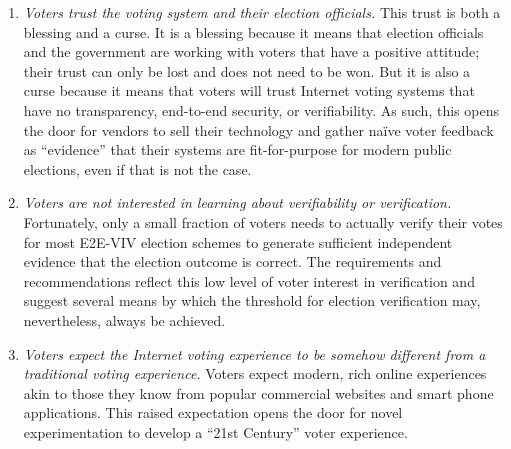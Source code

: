 \begin{enumerate}
\item \emph{Voters trust the voting system and their election
    officials.} This trust is both a blessing and a curse. It is a
  blessing because it means that election officials and the government
  are working with voters that have a positive attitude; their trust
  can only be lost and does not need to be won. But it is also a curse
  because it means that voters will trust Internet voting systems that
  have no transparency, end-to-end security, or verifiability. As
  such, this opens the door for vendors to sell their technology and
  gather na\"{i}ve voter feedback as ``evidence'' that their systems are
  fit-for-purpose for modern public elections, even if that is not the
  case.

\item \emph{Voters are not interested in learning about verifiability
    or verification.} Fortunately, only a small fraction of voters
  needs to actually verify their votes for most E2E-VIV election
  schemes to generate sufficient independent evidence that the
  election outcome is correct. The requirements and recommendations
  reflect this low level of voter interest in verification and suggest
  several means by which the threshold for election verification may,
  nevertheless, always be achieved.

\item \emph{Voters expect the Internet voting experience to be somehow
    different from a traditional voting experience.} Voters expect
  modern, rich online experiences akin to those they know from popular
  commercial websites and smart phone applications. This raised
  expectation opens the door for novel experimentation to develop a
  ``21st Century'' voter experience.
\end{enumerate}

